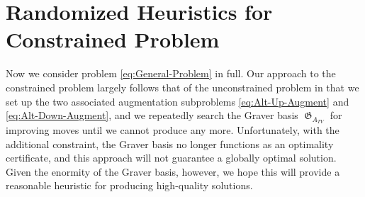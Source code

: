 \documentclass[pdflatex,sn-mathphys-num]{sn-jnl}%
\newtheorem{theorem}{Theorem}
\DeclareMathOperator{\Ecal}{\mathcal{E}}
\DeclareMathOperator{\Vcal}{\mathcal{V}}
\DeclareMathOperator{\Gfrak}{\mathfrak{G}}
\newcommand{\Miles}[1]{\textcolor{teal}{[Miles: #1]}}
\begin{document}

   

\section{Randomized Heuristics for Constrained Problem}\label{sec:trust-region}

Now we consider problem \eqref{eq:General-Problem} in full. 
Our approach to the constrained problem largely follows that of the unconstrained problem in that we set up the two associated augmentation subproblems \eqref{eq:Alt-Up-Augment} and \eqref{eq:Alt-Down-Augment}, and we repeatedly search the Graver basis $\Gfrak_{A_{TV}}$ for improving moves until we cannot produce any more.
Unfortunately, with the additional constraint, the Graver basis no longer functions as an optimality certificate, and this approach will not guarantee a globally optimal solution.
Given the enormity of the Graver basis, however, we hope this will provide a reasonable heuristic for producing high-quality solutions.
\end{document}
